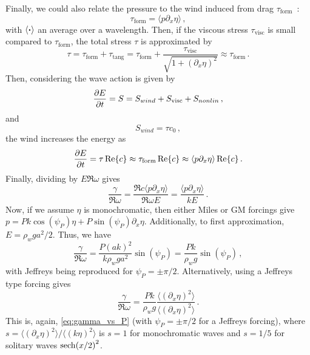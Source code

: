 \documentclass{jfm}
\begin{document}
Finally, we could also relate the pressure to the wind induced from drag
$\tau_{\text{form}}$~\citep{peirson2008wind}:
\begin{equation}
  \tau_{\text{form}} = \langle p \partial_x \eta \rangle \,,
\end{equation}
with $\langle \vdot \rangle$ an average over a wavelength.
Then, if the viscous stress $\tau_{\text{visc}}$ is small compared to
$\tau_{\text{form}}$, the total stress $\tau$ is approximated by
\begin{equation}
  \tau  = \tau_{\text{form}} + \tau_{\text{tang}} = \tau_{\text{form}} +
  \frac{\tau_{\text{visc}}}{\sqrt{1+(\partial_x \eta)^2}}
  \approx \tau_{\text{form}} \,.
\end{equation}
Then, considering the wave action is given by
\begin{equation}
  \pdv{E}{t} = S = S_{wind} + S_{\text{visc}} + S_{nonlin} \,,
\end{equation}
and
\begin{equation}
  S_{wind} = \tau c_0 \,,
\end{equation}
the wind increases the energy as
\begin{equation}
  \pdv{E}{t} = \tau \Re{c} \approx \tau_{\text{form}} \Re{c}
  \approx \langle p \partial_x \eta \rangle \Re{c} \,.
\end{equation}
Finally, dividing by $E \Re{\omega}$ gives
\begin{equation}
  \frac{\gamma}{\Re{\omega}}
  = \frac{\Re{c} \langle p \partial_x \eta \rangle}{\Re{\omega} E}
  = \frac{\langle p \partial_x \eta \rangle}{k E} \,.
\end{equation}
Now, if we assume $\eta$ is monochromatic, then either Miles or
GM forcings give $p = P k \cos(\psi_P) \eta + P \sin(\psi_P) \partial_x
\eta$.
Additionally, to first approximation, $E = \rho_w g a^2/2$.
Thus, we have
\begin{equation}
  \frac{\gamma}{\Re{\omega}}
  = \frac{P (ak)^2}{k \rho_w g a^2} \sin(\psi_P)
  = \frac{P k}{\rho_w g} \sin(\psi_P) \,,
\end{equation}
with Jeffreys being reproduced for $\psi_P = \pm \pi/2$.
Alternatively, using a Jeffreys type forcing gives
\begin{equation}
  \frac{\gamma}{\Re{\omega}}
  = \frac{P k}{\rho_w g} \frac{\langle (\partial_x \eta)^2 \rangle}
    {\langle (\partial_x \eta)^2 \rangle} \,.
\end{equation}
This is, again, \cref{eq:gamma_vs_P} (with $\psi_P = \pm \pi/2$ for a
Jeffreys forcing), where $s = \langle(\partial_x \eta)^2\rangle/
\langle(k \eta)^2\rangle$ is $s=1$ for monochromatic waves and $s=1/5$
for solitary waves $\sech(x/2)^2$.
\end{document}
